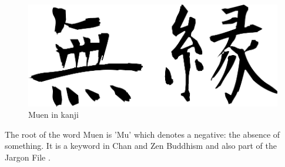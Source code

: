 \begin{figure}[h]
	\centering
	\includegraphics[scale=0.4]{images/muen.pdf}
	\caption{Muen in kanji}
	\label{fig:muen}
\end{figure}

The root of the word Muen is 'Mu' which denotes a negative: the absence of
something. It is a keyword in Chan and Zen Buddhism and also part of the Jargon
File \cite{jargonfile}.
